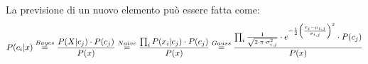 La previsione di un nuovo elemento può essere fatta come:
\begin{equation*}
    P(c_i | x) \stackrel{Bayes}{=} \frac{P(X | c_j) \cdot P(c_j)}{P(x)} \\
    \stackrel{Naive}{=} \frac{\prod_i P(x_i | c_j) \cdot P(c_j)}{P(x)} \\
    \stackrel{Gauss}{=} \frac{\prod_i \frac{1}{\sqrt{2\cdot \pi \cdot \sigma_{i, j}^2}}
        \cdot e^{- \frac{1}{2} \left(\frac{x_i - \mu_{i, j}}{\sigma_{i, j}}\right)^2}
        \cdot P(c_j)}{P(x)}
\end{equation*}
